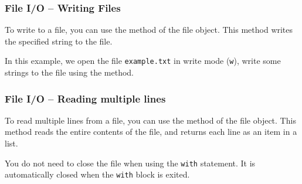 \documentclass{beamer}
\begin{document}
  \begin{frame} \frametitle{File I/O -- Writing Files} To write to a file, you can use the \texttt{} method of the file object. This method writes the specified string to the file.
  
  
  
  In this example, we open the file \texttt{example.txt} in write mode (\texttt{w}), write some strings to the file using the \texttt{} method. 
\end{frame}
\begin{frame}
  \frametitle{File I/O -- Reading multiple lines}
  To read multiple lines from a file, you can use the \texttt{} method of the file object. This method reads the entire contents of the file, and returns each line as an item in a list.
  
  You do not need to close the file when using the \texttt{with} statement. It is automatically closed when the \texttt{with} block is exited.
\end{frame}
\end{document}
